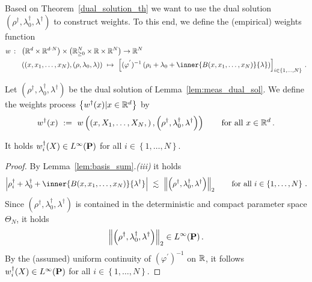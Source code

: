 Based on Theorem~\ref{dual_solution_th}
we want to use the dual 
solution 
$
\left( \rho^\dagger,\lambda_0^\dagger,\lambda^\dagger \right)
$
to construct weights.
To this end, we define the (empirical) weights function
\begin{align*}
 w\ \colon\
 &
 \left( 
  \R^d\times \R^{d\cdot N}
 \right)
  \times
  \left( 
\R^N_{\ge 0}\times \R\times \R^N
  \right)
  \to
  \R^N
  \\
 &
  \left( 
  (x,x_1,\ldots,x_N),(\rho,\lambda_0,\lambda)
  \right)
  \ 
  \mapsto
  \ 
  \left[ 
  (\varphi^{'})^{-1}
  \left( 
    \rho_i
    +
    \lambda_0
    +
    \inner
    {B(x,x_1,\ldots,x_N)}
    {\lambda}
  \right)
\right]_{i\in \left\{ 1,\ldots,N \right\}}
\,.
\end{align*}
\begin{definition}
  Let 
  $
\left( \rho^\dagger,\lambda_0^\dagger,\lambda^\dagger \right)
  $
  be the dual solution of Lemma~\ref{lem:meas_dual_sol}.
  We define the weights process 
  $\left\{ w^\dagger(x) | x\in\R^d\right\}$
  by
  \begin{align*}
    w^\dagger(x) 
    \ 
    :=
    \ 
    w
    \left( 
    \left( 
    x,X_1,\ldots,X_N,
    \right)
    ,
\left( \rho^\dagger,\lambda_0^\dagger,\lambda^\dagger \right)
    \right)
    \qquad
    \text{for all}\ 
    x\in\R^d
    \,.
  \end{align*}
\end{definition}
\begin{lemma}
  \label{weights_l_inf}
  It holds
  $w_i^\dagger(X)\in L^\infty(\P)$
  for all $i\in \left\{ 1,\ldots,N \right\}$.
\end{lemma}
\begin{proof}
  By Lemma~\ref{lem:basis_sum}.\textit{(iii)} it holds
  \begin{align*}
  \left| 
    \rho_i^\dagger
    +
    \lambda_0^\dagger
    +
    \inner
    {B(x,x_1,\ldots,x_N)}
    {\lambda^\dagger}
  \right|
  \ 
  \lesssim
  \ 
  \norm{
\left( \rho^\dagger,\lambda_0^\dagger,\lambda^\dagger \right)
  }_2
  \qquad
  \text{for all}\ 
  i \in \left\{ 1,\ldots,N \right\}
  \,.
  \end{align*}
  Since
  $
\left( \rho^\dagger,\lambda_0^\dagger,\lambda^\dagger \right)
  $ is contained in the deterministic and compact parameter space $\Theta_N$,
  it holds
  \begin{align*}
  \norm{
\left( \rho^\dagger,\lambda_0^\dagger,\lambda^\dagger \right)
  }_2
  \in 
  L^{\infty}(\P)
  \,.
  \end{align*}
  By the (assumed) uniform continuity of 
  $
  (\varphi^{'})^{-1}
  $
  on $\R$, it follows 
  $w_i^\dagger(X)\in L^\infty(\P)$
  for all $i\in \left\{ 1,\ldots,N \right\}$.
\end{proof}
